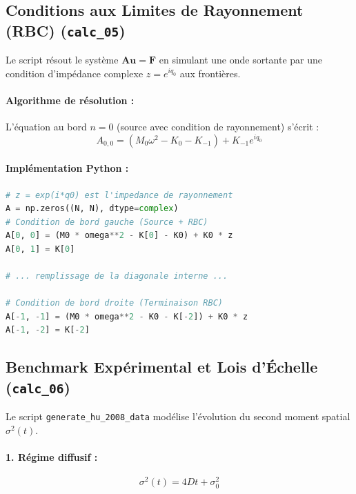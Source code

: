 \subsection{Conditions aux Limites de Rayonnement (RBC) (\texttt{calc\_05})}

Le script résout le système $\mathbf{A} \mathbf{u} = \mathbf{F}$ en simulant une onde sortante par une condition d'impédance complexe $z = e^{iq_0}$ aux frontières.

\paragraph{Algorithme de résolution :}
L'équation au bord $n=0$ (source avec condition de rayonnement) s'écrit :
\begin{equation*}
    A_{0,0} = (M_0 \omega^2 - K_0 - K_{-1}) + K_{-1} e^{iq_0}
\end{equation*}

\paragraph{Implémentation Python :}
\begin{lstlisting}[language=Python, caption={Inversion de matrice avec conditions aux limites de rayonnement}]
# z = exp(i*q0) est l'impedance de rayonnement
A = np.zeros((N, N), dtype=complex)
# Condition de bord gauche (Source + RBC)
A[0, 0] = (M0 * omega**2 - K[0] - K0) + K0 * z
A[0, 1] = K[0]

# ... remplissage de la diagonale interne ...

# Condition de bord droite (Terminaison RBC)
A[-1, -1] = (M0 * omega**2 - K0 - K[-2]) + K0 * z
A[-1, -2] = K[-2]
\end{lstlisting}

\subsection{Benchmark Expérimental et Lois d'Échelle (\texttt{calc\_06})}

Le script \texttt{generate\_hu\_2008\_data} modélise l'évolution du second moment spatial $\sigma^2(t)$.

\paragraph{1. Régime diffusif :}
\begin{equation*}
    \sigma^2(t) = 4D t + \sigma_0^2
\end{equation*}

